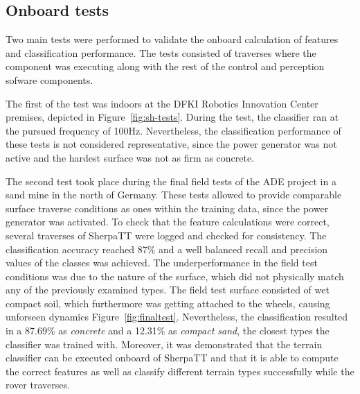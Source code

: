\documentclass{article}
\begin{document}
\subsection{Onboard tests}

Two main tests were performed to validate the onboard calculation of features and classification performance.
The tests consisted of traverses where the component was executing along with the rest of the control and perception sofware components. 

The first of the test was indoors at the DFKI Robotics Innovation Center premises, depicted in Figure~\ref{fig:sh-tests}.
During the test, the classifier ran at the pursued frequency of 100Hz.
Nevertheless, the classification performance of these tests is not considered representative, since the power generator was not active and the hardest surface was not as firm as concrete. 


The second test took place during the final field tests of the ADE project \cite{ocon2021} in a sand mine in the north of Germany.
These tests allowed to provide comparable surface traverse conditions as ones within the training data, since the power generator was activated.
To check that the feature calculations were correct, several traverses of SherpaTT were logged and checked for consistency. 
The classification accuracy reached 87\% and a well balanced recall and precision values of the classes was achieved. 
The underperformance in the field test conditions was due to the nature of the surface, which did not physically match any of the previously examined types. 
The field test surface consisted of wet compact soil, which furthermore was getting attached to the wheels, causing unforseen dynamics Figure~\ref{fig:finaltest}.
Nevertheless, the classification resulted in a 87.69\% as \emph{concrete} and a 12.31\% as \emph{compact sand}, the closest types the classifier was trained with.
Moreover, it was demonstrated that the terrain classifier can be executed onboard of SherpaTT and that it is able to compute the correct features as well as classify different terrain types successfully while the rover traverses.
\end{document}
